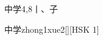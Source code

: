\begin{entry}{中学}{4,8}{⼁、⼦}
  \begin{phonetics}{中学}{zhong1xue2}[][HSK 1]
  \end{phonetics}
\end{entry}
